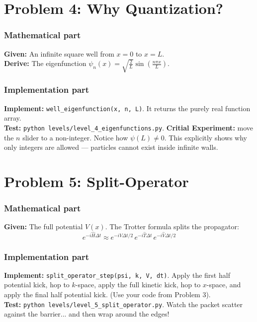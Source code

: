 \documentclass[11pt]{article}
\begin{document}
\section*{Problem 4: Why Quantization?}

\subsubsection*{Mathematical part}
\textbf{Given:} An infinite square well from $x=0$ to $x=L$. \\
\textbf{Derive:} The eigenfunction $\psi_n(x) = \sqrt{\frac{2}{L}}\sin\left(\frac{n\pi x}{L}\right)$.

\subsubsection*{Implementation part}
\textbf{Implement:} \lstinline|well_eigenfunction(x, n, L)|. It returns the purely real function array. \\
\textbf{Test:} \lstinline|python levels/level_4_eigenfunctions.py|. \textbf{Critial Experiment:} move the $n$ slider to a non-integer. Notice how $\psi(L) \neq 0$. This explicitly shows why only integers are allowed — particles cannot exist inside infinite walls.


\section*{Problem 5: Split-Operator}

\subsubsection*{Mathematical part}
\textbf{Given:} The full potential $V(x)$. The Trotter formula splits the propagator:
$$ e^{-i \hat{H} \Delta t } \approx e^{-i \hat{V} \Delta t/2 } \, e^{-i \hat{T} \Delta t } \, e^{-i \hat{V} \Delta t/2 } $$

\subsubsection*{Implementation part}
\textbf{Implement:} \lstinline|split_operator_step(psi, k, V, dt)|. Apply the first half potential kick, hop to $k$-space, apply the full kinetic kick, hop to $x$-space, and apply the final half potential kick. (Use your code from Problem 3). \\
\textbf{Test:} \lstinline|python levels/level_5_split_operator.py|. Watch the packet scatter against the barrier... and then wrap around the edges!
\end{document}
